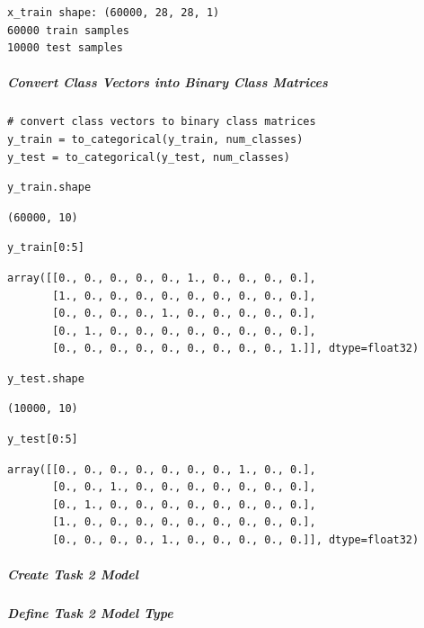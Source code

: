 \begin{verbatim}
x_train shape: (60000, 28, 28, 1)
60000 train samples
10000 test samples
\end{verbatim}

\subparagraph{Convert Class Vectors into Binary Class Matrices}

\begin{verbatim}
# convert class vectors to binary class matrices
y_train = to_categorical(y_train, num_classes)
y_test = to_categorical(y_test, num_classes)
\end{verbatim}

\begin{verbatim}
y_train.shape
\end{verbatim}

\begin{verbatim}
(60000, 10)
\end{verbatim}

\begin{verbatim}
y_train[0:5]
\end{verbatim}

\begin{verbatim}
array([[0., 0., 0., 0., 0., 1., 0., 0., 0., 0.],
       [1., 0., 0., 0., 0., 0., 0., 0., 0., 0.],
       [0., 0., 0., 0., 1., 0., 0., 0., 0., 0.],
       [0., 1., 0., 0., 0., 0., 0., 0., 0., 0.],
       [0., 0., 0., 0., 0., 0., 0., 0., 0., 1.]], dtype=float32)
\end{verbatim}

\begin{verbatim}
y_test.shape
\end{verbatim}

\begin{verbatim}
(10000, 10)
\end{verbatim}

\begin{verbatim}
y_test[0:5]
\end{verbatim}

\begin{verbatim}
array([[0., 0., 0., 0., 0., 0., 0., 1., 0., 0.],
       [0., 0., 1., 0., 0., 0., 0., 0., 0., 0.],
       [0., 1., 0., 0., 0., 0., 0., 0., 0., 0.],
       [1., 0., 0., 0., 0., 0., 0., 0., 0., 0.],
       [0., 0., 0., 0., 1., 0., 0., 0., 0., 0.]], dtype=float32)
\end{verbatim}

\subparagraph{Create Task 2 Model}

\subparagraph{Define Task 2 Model Type}


